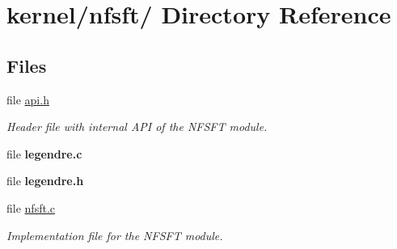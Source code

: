 \hypertarget{dir_000004}{
\section{kernel/nfsft/ Directory Reference}
\label{dir_000004}
}
\subsection*{Files}
\begin{CompactItemize}
\item 
file \hyperlink{api_8h}{api.h}
\begin{CompactList}\small\item\em Header file with internal API of the NFSFT module. \item\end{CompactList}

\item 
file {\bf legendre.c}
\item 
file {\bf legendre.h}
\item 
file \hyperlink{nfsft_8c}{nfsft.c}
\begin{CompactList}\small\item\em Implementation file for the NFSFT module. \item\end{CompactList}

\end{CompactItemize}
